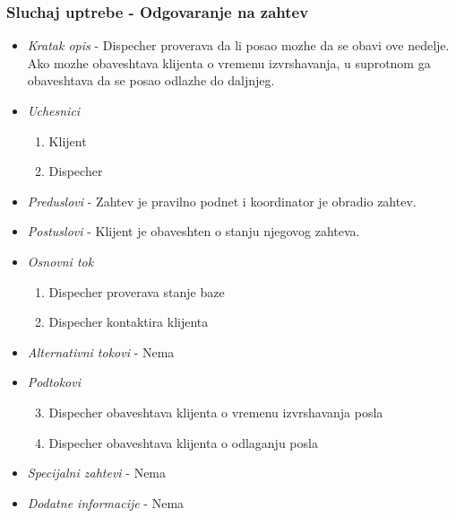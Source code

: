 \documentclass[10 pt]{article}
\begin{document}
	\subsubsection{Sluchaj uptrebe - Odgovaranje na zahtev}
	\begin{itemize}
		
		\item \textit{Kratak opis} -  Dispecher proverava da li posao mozhe da se obavi ove nedelje. Ako mozhe obaveshtava klijenta o vremenu izvrshavanja, u suprotnom ga obaveshtava da se posao odlazhe do daljnjeg.
		
		\item \textit{Uchesnici}
		\begin{enumerate}
			\item Klijent
			\item Dispecher
		\end{enumerate}
		
		\item \textit{Preduslovi} - Zahtev je pravilno podnet i koordinator je obradio zahtev.
		
		\item \textit{Postuslovi} - Klijent je obaveshten o stanju njegovog zahteva.
		
		\item \textit{Osnovni tok}
		\begin{enumerate}
			\item Dispecher proverava stanje baze
			\item Dispecher kontaktira klijenta
		\end{enumerate}
		
		\item \textit{Alternativni tokovi} - Nema
		
		\item \textit{Podtokovi} 
		\begin{enumerate}
				\begin{enumerate}
					\setcounter{enumi}{2}
					\item Dispecher obaveshtava klijenta o vremenu izvrshavanja posla
					\item Dispecher obaveshtava klijenta o odlaganju posla
				\end{enumerate}
		\end{enumerate}
		
		\item \textit{Specijalni zahtevi} - Nema
		
		\item \textit{Dodatne informacije} - Nema
		
	\end{itemize}
	
\end{document}
